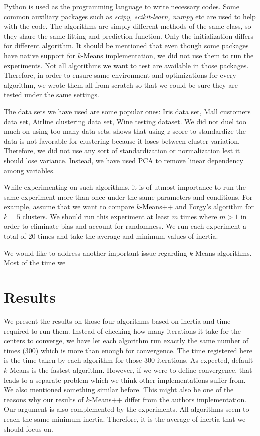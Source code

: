 \documentclass[twoside, 11pt]{article}
\begin{document}
	Python is used as the programming language to write necessary codes. Some common auxiliary packages such as \textit{scipy, scikit-learn, numpy} etc are used to help with the code. The algorithms are simply different methods of the same class, so they share the same fitting and prediction function. Only the initialization differs for different algorithm. It should be mentioned that even though some packages have native support for $k$-Means implementation, we did not use them to run the experiments. Not all algorithms we want to test are available in those packages. Therefore, in order to ensure same environment and optimizations for every algorithm, we wrote them all from scratch so that we could be sure they are tested under the same settings.
	
	The data sets we have used are some popular ones: Iris data set, Mall customers data set, Airline clustering data set, Wine testing dataset. We did not duel too much on using too many data sets. \cite{miligan} shows that using $z$-score to standardize the data is not favorable for clustering because it loses between-cluster variation. Therefore, we did not use any sort of standardization or normalization lest it should lose variance. Instead, we have used PCA to remove linear dependency among variables. 
	
	While experimenting on such algorithms, it is of utmost importance to run the same experiment more than once under the same parameters and conditions. For example, assume that we want to compare $k$-Means++ and Forgy's algorithm \citep{forgy} for $k=5$ clusters. We should run this experiment at least $m$ times where $m>1$ in order to eliminate bias and account for randomness. We run each experiment a total of $20$ times and take the average and minimum values of inertia.
	
	We would like to address another important issue regarding $k$-Means algorithms. Most of the time we 
	\section{Results}
	We present the results on those four algorithms based on inertia and time required to run them. Instead of checking how many iterations it take for the centers to converge, we have let each algorithm run exactly the same number of times ($300$) which is more than enough for convergence. The time registered here is the time taken by each algorithm for those $300$ iterations. As expected, default $k$-Means is the fastest algorithm. However, if we were to define convergence, that leads to a separate problem which we think other implementations suffer from. We also mentioned something similar before. This might also be one of the reasons why our results of $k$-Means++ differ from the authors implementation. Our argument is also complemented by the experiments. All algorithms seem to reach the same minimum inertia. Therefore, it is the average of inertia that we should focus on.
\end{document}
